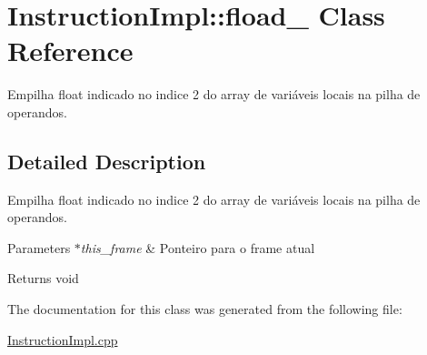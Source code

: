 \hypertarget{class_instruction_impl_1_1fload__2}{}\section{Instruction\+Impl\+:\+:fload\+\_ Class Reference}
\label{class_instruction_impl_1_1fload__2}


Empilha float indicado no indice 2 do array de variáveis locais na pilha de operandos.  




\subsection{Detailed Description}
Empilha float indicado no indice 2 do array de variáveis locais na pilha de operandos. 


\begin{DoxyParams}{Parameters}
{\em $\ast$this\+\_\+frame} & Ponteiro para o frame atual \\
\hline
\end{DoxyParams}
\begin{DoxyReturn}{Returns}
void 
\end{DoxyReturn}


The documentation for this class was generated from the following file\+:\begin{DoxyCompactItemize}
\item 
\hyperlink{_instruction_impl_8cpp}{Instruction\+Impl.\+cpp}\end{DoxyCompactItemize}
